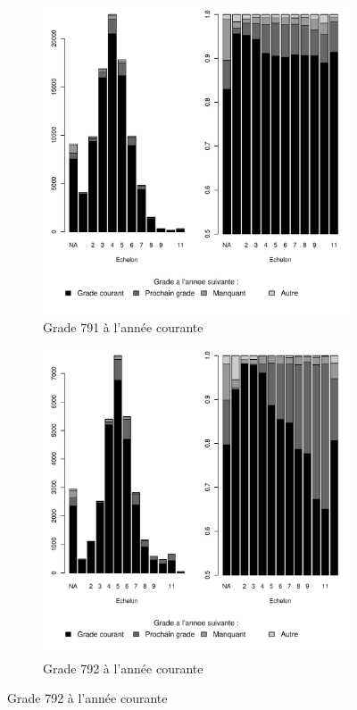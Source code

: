 \documentclass[11pt,a4paper]{article}
\begin{document}
\begin{figure}[ht] 
  \caption{Situation d'une année à l'autre, selon l'échelon}
  \label{evo_by_ech_AT} 
  \begin{subfigure}[b]{0.5\linewidth}
      \caption{Grade 791 à l'année courante}
    \label{evo_by_ech_791} 
    \centering
    \includegraphics[width=1\linewidth]{AA_hazard_by_ech_791.pdf} 
  \end{subfigure}
  \begin{subfigure}[b]{0.5\linewidth}
        \caption{Grade 792 à l'année courante} 
    \label{evo_by_ech_792} 
    \centering
    \includegraphics[width=1\linewidth]{AA_hazard_by_ech_792.pdf} 
  \end{subfigure} 
\end{figure}
\end{document}
